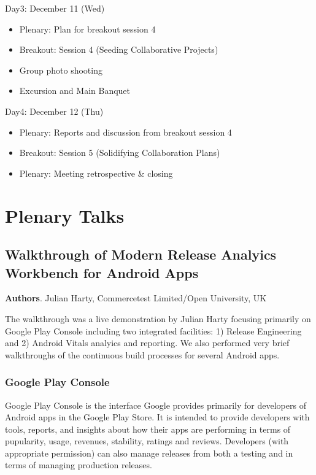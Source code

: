 \documentclass[a4paper]{article}
\newcommand{\smallsection}[1]{\noindent \textbf{#1}. }
\begin{document}
\begin{bfseries}
Day3: December 11 (Wed)
\end{bfseries}
\begin{itemize}
\item Plenary: Plan for breakout session 4
\item Breakout: Session 4 (Seeding Collaborative Projects)
\item Group photo shooting
\item Excursion and Main Banquet
\end{itemize}
\begin{bfseries}
Day4: December 12 (Thu)
\end{bfseries}
\begin{itemize}
\item Plenary: Reports and discussion from breakout session 4
\item Breakout: Session 5 (Solidifying Collaboration Plans)
\item Plenary: Meeting retrospective \& closing
\end{itemize}

\clearpage

\section{Plenary Talks}

\subsection{Walkthrough of Modern Release Analyics Workbench for Android Apps}
\smallsection{Authors}
Julian Harty, Commercetest Limited/Open University, UK \linebreak

The walkthrough was a live demonstration by Julian Harty focusing primarily on Google Play Console including two integrated facilities: 1) Release Engineering and 2) Android Vitals analyics and reporting. We also performed very brief walkthroughs of the continuous build processes for several Android apps.

\subsubsection{Google Play Console}
Google Play Console is the interface Google provides primarily for developers of Android apps in the Google Play Store. It is intended to provide developers with tools, reports, and insights about how their apps are performing in terms of pupularity, usage, revenues, stability, ratings and reviews. Developers (with appropriate permission) can also manage releases from both a testing and in terms of managing production releases.
\end{document}
